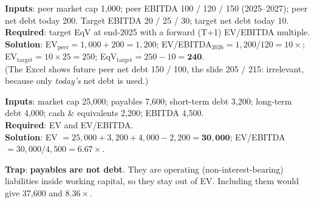 \begin{exbox}
\textbf{Inputs}: peer market cap 1,000; peer EBITDA 100 / 120 / 150 (2025--2027); peer net debt today 200. Target EBITDA 20 / 25 / 30; target net debt today 10.\\
\textbf{Required}: target EqV at end-2025 with a forward (T+1) EV/EBITDA multiple.\\
\textbf{Solution}: EV$_{\text{peer}}=1{,}000+200=1{,}200$; EV/EBITDA$_{2026}=1{,}200/120=10\times$; EV$_{\text{target}}=10\times25=250$; EqV$_{\text{target}}=250-10=\mathbf{240}$.\\
\footnotesize(The Excel shows future peer net debt 150 / 100, the slide 205 / 215: irrelevant, because only \emph{today's} net debt is used.)
\end{exbox}

\begin{exbox}
\textbf{Inputs}: market cap 25,000; payables 7,600; short-term debt 3,200; long-term debt 4,000; cash \& equivalents 2,200; EBITDA 4,500.\\
\textbf{Required}: EV and EV/EBITDA.\\
\textbf{Solution}: EV $=25{,}000+3{,}200+4{,}000-2{,}200=\mathbf{30{,}000}$; EV/EBITDA $=30{,}000/4{,}500=\mathbf{6.67\times}$.
\begin{center}\small\textcolor{keyred}{\textbf{Trap}}: \textbf{payables are not debt}. They are operating (non-interest-bearing) liabilities inside working capital, so they stay out of EV. Including them would give 37,600 and $8.36\times$.\end{center}
\end{exbox}

